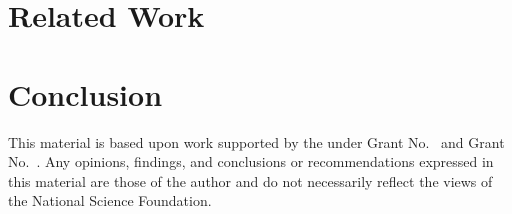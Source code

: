 \documentclass[review, anonymous, acmsmall]{acmart}
\begin{document}
\section{Related Work}

\section{Conclusion}

\begin{acks}                            %
  This material is based upon work supported by the
   under Grant
  No.~ and Grant
  No.~.  Any opinions, findings, and
  conclusions or recommendations expressed in this material are those
  of the author and do not necessarily reflect the views of the
  National Science Foundation.
\end{acks}


\end{document}
